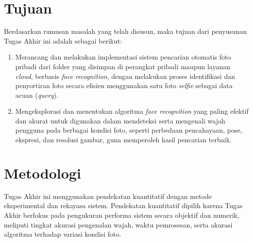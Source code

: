 \section{Tujuan}
Berdasarkan rumusan masalah yang telah disusun, maka tujuan dari penyusunan Tugas Akhir ini adalah sebagai berikut:
\begin{enumerate}
\item Merancang dan melakukan implementasi sistem pencarian otomatis foto pribadi dari folder yang disimpan di perangkat pribadi maupun layanan \textit{cloud}, berbasis \textit{face recognition}, dengan melakukan proses identifikasi dan penyortiran foto secara efisien menggunakan satu foto \textit{selfie} sebagai data acuan (\textit{query}).
\item Mengeksplorasi dan menentukan algoritma \textit{face recognition} yang paling efektif dan akurat untuk digunakan dalam mendeteksi serta mengenali wajah pengguna pada berbagai kondisi foto, seperti perbedaan pencahayaan, pose, ekspresi, dan resolusi gambar, guna memperoleh hasil pencarian terbaik.
\end{enumerate}

%    

\section{Metodologi}
Tugas Akhir ini menggunakan pendekatan kuantitatif dengan metode eksperimental dan rekayasa sistem. Pendekatan kuantitatif dipilih karena Tugas Akhir berfokus pada pengukuran performa sistem secara objektif dan numerik, meliputi tingkat akurasi pengenalan wajah, waktu pemrosesan, serta akurasi algoritma terhadap variasi kondisi foto.

